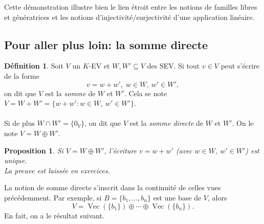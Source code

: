 \documentclass[oneside,12pt,french,table]{book}
\DeclareMathOperator{\Span}{Vec}
\newtheorem{prop}{Proposition}[section]
\theoremstyle{definition}
\theoremstyle{definition}
\theoremstyle{definition}
\newtheorem{definition}{Définition}[chapter]
\begin{document}
Cette démonstration illustre bien le lien étroit entre les notions de familles libres et génératrices et les notions d'injectivité/surjectivité d'une application linéaire.
\subsection{Pour aller plus loin: la somme directe}
\begin{definition}
    Soit $V$ un $K$-EV et $W,W' \subseteq V$ des SEV. Si tout $v \in V$ peut s'écrire de la forme $$v= w + w', \; w \in W, \ w' \in W',$$
    on dit que $V$ est la \textit{somme} de $W$ et $W'$. Cela se note $V = W + W' = \{ w + w' : w \in W, \ w' \in W'\}$. \\ \\
    Si de plus $W \cap W' = \{ 0_V \}$, on dit que $V$ est la \textit{somme directe} de $W$ et $W'$. On le note $V = W \oplus W'$.
\end{definition}
\begin{prop}
Si $V = W \oplus W'$, l'écriture $v = w + w'$ (avec $w \in W$, $w' \in W'$) est unique. \\
La preuve est laissée en exercices.
\end{prop}
\noindent 
La notion de somme directe s'inscrit dans la continuité de celles vues précédemment. Par exemple, si $B = \{b_1,...,b_n\}$ est une base de $V$, alors $$V = \Span(\{ b_1 \}) \oplus \cdots \oplus \Span(\{ b_n \}).$$
En fait, on a le résultat suivant.
\end{document}
